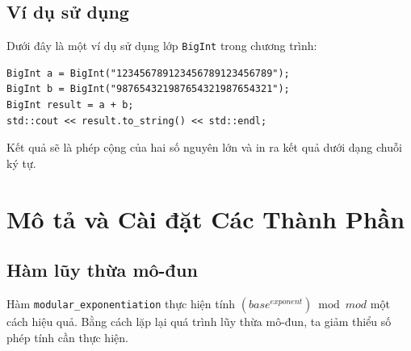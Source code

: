 \documentclass[a4paper,12pt]{article}
\begin{document}


\subsection{Ví dụ sử dụng}

Dưới đây là một ví dụ sử dụng lớp \texttt{BigInt} trong chương trình:

\begin{lstlisting}
BigInt a = BigInt("123456789123456789123456789");
BigInt b = BigInt("987654321987654321987654321");
BigInt result = a + b;
std::cout << result.to_string() << std::endl;
\end{lstlisting}

Kết quả sẽ là phép cộng của hai số nguyên lớn và in ra kết quả dưới dạng chuỗi ký tự.















\section{Mô tả và Cài đặt Các Thành Phần}

\subsection{Hàm lũy thừa mô-đun}
Hàm \texttt{modular\_exponentiation} thực hiện tính $(base^{exponent}) \bmod mod$ một cách hiệu quả. Bằng cách lặp lại quá trình lũy thừa mô-đun, ta giảm thiểu số phép tính cần thực hiện.\\
\end{document}
